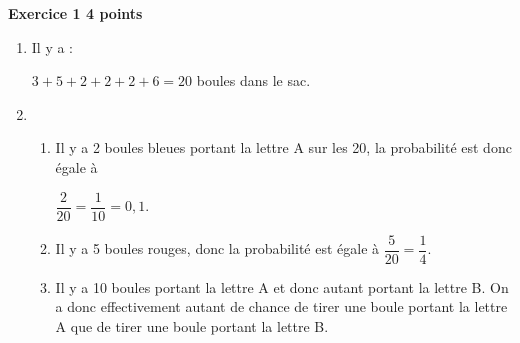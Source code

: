 \textbf{Exercice 1 \hfill 4 points}

\medskip

%
 
\begin{enumerate}
\item %
Il y a :

$3 + 5 + 2 + 2 + 2 + 6 = 20$ boules dans le sac. 
\item %
	\begin{enumerate}
		\item %
Il y a 2 boules bleues portant la lettre A sur les 20, la probabilité est donc égale à 

$\dfrac{2}{20} = \dfrac{1}{10} = 0,1$. 		 
		\item %
Il y a 5 boules rouges, donc la probabilité est égale à $\dfrac{5}{20} = \dfrac{1}{4}$. 
		\item %
		Il y a 10 boules portant la lettre A et donc autant portant la lettre B. On a donc effectivement autant de chance de tirer une boule portant la lettre A que de tirer une boule portant la lettre B.
	\end{enumerate}
\end{enumerate}
 
\bigskip

